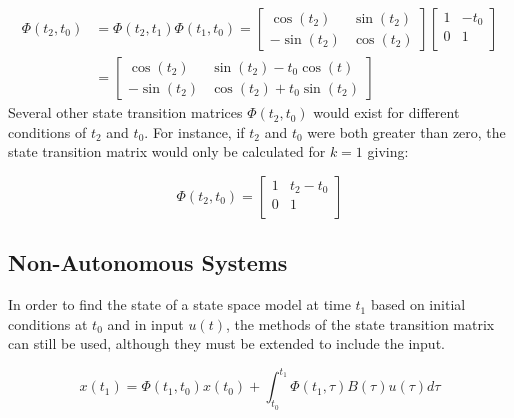\begin{example}
  \begin{equation*}
    \begin{split}
      \Phi(t_{2},t_{0})
      &=\Phi(t_{2},t_{1})\Phi(t_{1},t_{0})=
      \begin{bmatrix}
        \cos(t_{2}) & \sin(t_{2}) \\ -\sin(t_{2}) & \cos(t_{2})
      \end{bmatrix}
      \begin{bmatrix}
        1 & -t_{0} \\ 0 & 1 \\
      \end{bmatrix} \\
      &=
      \begin{bmatrix}
        \cos(t_{2}) & \sin(t_{2})-t_{0}\cos(t) \\ -\sin(t_{2}) & \cos(t_{2})+t_{0}\sin(t_{2})
      \end{bmatrix}
    \end{split}
  \end{equation*}
  Several other state transition matrices $\Phi(t_{2},t_{0})$ would exist for different conditions of $t_{2}$ and $t_{0}$.
  For instance, if $t_{2}$ and $t_{0}$ were both greater than zero, the state transition matrix would only be calculated for $k=1$ giving:

  \begin{equation*}
    \Phi(t_{2},t_{0})=
    \begin{bmatrix}
      1 & t_{2}-t_{0} \\ 0 & 1 \\
    \end{bmatrix}
  \end{equation*}
\end{example}

\subsection{Non-Autonomous Systems}

In order to find the state of a state space model at time $t_{1}$ based on initial conditions at $t_{0}$ and in input $u(t)$, the methods of the state transition matrix can still be used, although they must be extended to include the input.

\begin{equation*}
  x(t_{1})=\Phi(t_{1},t_{0})x(t_{0})+\int_{t_{0}}^{t_{1}}\Phi(t_{1},\tau)B(\tau)u(\tau)d\tau
\end{equation*}

